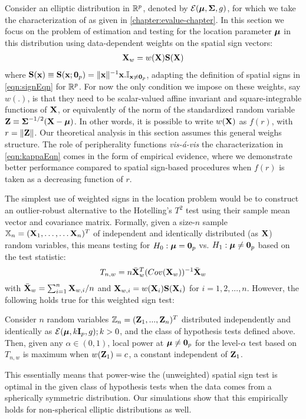 Consider an elliptic distribution in ${\mathbb{R}}^p$, denoted by ${\cal{E}} ({\boldsymbol{\mu}}, {\boldsymbol{\Sigma}}, g)$, for which we take the characterization of \cite{FangEtal90} as given in \ref{chapter:evalue-chapter}. In this section we focus on the problem of estimation and testing for the location parameter ${\boldsymbol{\mu}}$ in this distribution using data-dependent weights on the spatial sign vectors:
%
\begin{align*}
{\mathbf{X}}_w = w( {\mathbf{X}}) {\mathbf{S}}( {\mathbf{X}})
\end{align*}
%
where ${\mathbf{S}} ({\bf{x}}) \equiv  {\mathbf{S}} ({\bf{x}}; {\bf 0}_p) = \| {\bf{x}} \|^{-1} {\bf{x}} . {{\mathbb{I}}}_{ {\bf{x}} \neq {\bf 0}_p }$, adapting the definition of spatial signs in \ref{eqn:signEqn} for ${\mathbb{R}}^p$. For now the only condition we impose on these weights, say $w(.)$, is that they need to be scalar-valued affine invariant and square-integrable functions of ${\mathbf{X}}$, or equivalently of the norm of the standardized random variable ${\mathbf{Z}} \equiv {\boldsymbol{\Sigma}}^{-1/2} ({\mathbf{X}} - {\boldsymbol{\mu}})$. In other words, it is possible to write $w({\mathbf{X}})$ as $f(r)$, with $r = \| {\mathbf{Z}} \|$. Our theoretical analysis in this section assumes this general weighs structure. The role of peripherality functions \textit{vis-\'{a}-vis} the characterization in \ref{eqn:kappaEqn} comes in the form of empirical evidence, where we demonstrate better performance compared to spatial sign-based procedures when $f(r)$ is taken as a decreasing function of $r$.

The simplest use of weighted signs in the location problem would be to construct an outlier-robust alternative to the Hotelling's $T^2$ test using their sample mean vector and covariance matrix. Formally, given a size-$n$ sample ${\mathbb{X}}_n = ({\mathbf{X}}_1, \ldots, \ldots {\mathbf{X}}_n)^T$ of independent and identically distributed (as ${\mathbf{X}}$) random variables, this means testing for $H_0: {\boldsymbol{\mu}} = {\bf 0}_p$ vs. $H_1:{\boldsymbol{\mu}} \neq {\bf 0}_p$  based on the test statistic:
%
$$ T_{n,w} = n \bar{{\mathbf{X}}}_w^T ( Cov ({\mathbf{X}}_w))^{-1} \bar{{\mathbf{X}}}_w $$
%
with $\bar{{\mathbf{X}}}_w = \sum_{i=1}^n {\mathbf{X}}_{w,i}/n$ and ${\mathbf{X}}_{w,i} = w({\mathbf{X}}_i ) {\mathbf{S}} ({\mathbf{X}}_i)$ for $i=1,2,...,n$. However, the following holds true for this weighted sign test:
%
\begin{Proposition}\label{proposition:SignTest}
Consider $n$ random variables ${\mathbb{Z}}_n = ({\mathbf{Z}}_1,...,{\mathbf{Z}}_n)^T$ distributed independently and identically as $\mathcal{E}( {\boldsymbol{\mu}}, k{\mathbf{I}}_p, g); k > 0$, and the class of hypothesis tests defined above. Then, given any $\alpha \in (0,1)$, local power at ${\boldsymbol{\mu}} \neq {\bf 0}_p$ for the level-$\alpha$ test  based on $T_{n,w}$ is maximum when $w({\mathbf{Z}}_1) = c$, a constant independent of ${\mathbf{Z}}_1$.
\end{Proposition}
%
\noindent This essentially means that power-wise the (unweighted) spatial sign test \citep{OjaBook10} is optimal in the given class of hypothesis tests when the data comes from a spherically symmetric distribution. Our simulations show that this empirically holds for non-spherical elliptic distributions as well.

